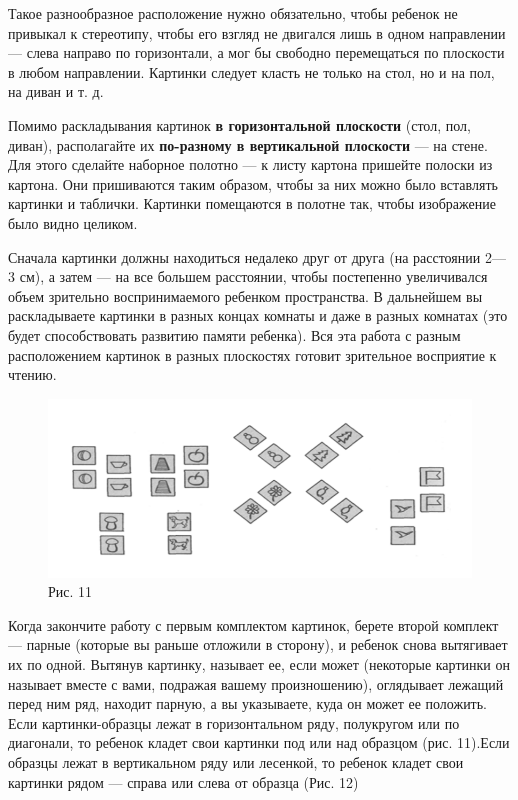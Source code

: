\documentclass[a5paper]{book}
\begin{document}
Такое разнообразное расположение нужно обязательно, чтобы ребенок не
привыкал к стереотипу, чтобы его взгляд не двигался лишь в одном
направлении --- слева направо по горизонтали, а мог бы свободно
перемещаться по плоскости в любом направлении. Картинки следует класть
не только на стол, но и на пол, на диван и т. д.

Помимо раскладывания картинок \textbf{в горизонтальной плоскости} (стол,
пол, диван), располагайте их \textbf{по-разному в вертикальной
плоскости} --- на стене. Для этого сделайте наборное полотно --- к листу
картона пришейте полоски из картона. Они пришиваются таким образом,
чтобы за них можно было вставлять картинки и таблички. Картинки
помещаются в полотне так, чтобы изображение было видно целиком.

Сначала картинки должны находиться недалеко друг от друга (на расстоянии
2---3 см), а затем --- на все большем расстоянии, чтобы постепенно
увеличивался объем зрительно воспринимаемого ребенком пространства. В
дальнейшем вы раскладываете картинки в разных концах комнаты и даже в
разных комнатах (это будет способствовать развитию памяти ребенка). Вся
эта работа с разным расположением картинок в разных плоскостях готовит
зрительное восприятие к чтению.

\begin{figure}
\centering
\includegraphics[width=\linewidth]{media/media/image11.png}
\caption*{Рис. 11}
\end{figure}

Когда закончите работу с первым комплектом картинок, берете второй
комплект --- парные (которые вы раньше отложили в сторону), и ребенок
снова вытягивает их по одной. Вытянув картинку, называет ее, если может
(некоторые картинки он называет вместе с вами, подражая вашему
произношению), оглядывает лежащий перед ним ряд, находит парную, а вы
указываете, куда он может ее положить. Если картинки-образцы лежат в
горизонтальном ряду, полукругом или по диагонали, то ребенок кладет свои
картинки под или над образцом (рис. 11).Если образцы лежат в
вертикальном ряду или лесенкой, то ребенок кладет свои картинки рядом
--- справа или слева от образца (Рис. 12)
\end{document}
